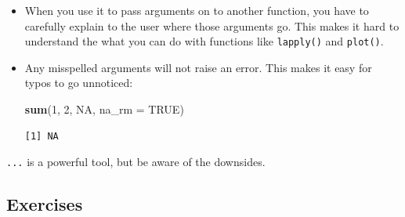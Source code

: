 \documentclass[]{book}
\newenvironment{Shaded}{\begin{snugshade}}{\end{snugshade}}
\newcommand{\DataTypeTok}[1]{\textcolor[rgb]{0.13,0.29,0.53}{#1}}
\newcommand{\DecValTok}[1]{\textcolor[rgb]{0.00,0.00,0.81}{#1}}
\newcommand{\KeywordTok}[1]{\textcolor[rgb]{0.13,0.29,0.53}{\textbf{#1}}}
\newcommand{\NormalTok}[1]{#1}
\newcommand{\OtherTok}[1]{\textcolor[rgb]{0.56,0.35,0.01}{#1}}
\theoremstyle{definition}
\theoremstyle{definition}
\theoremstyle{definition}
\theoremstyle{remark}
\begin{document}
\begin{itemize}
\item
  When you use it to pass arguments on to another function, you have to
  carefully explain to the user where those arguments go. This makes it
  hard to understand the what you can do with functions like
  \texttt{lapply()} and \texttt{plot()}.
\item
  Any misspelled arguments will not raise an error. This makes it easy
  for typos to go unnoticed:

\begin{Shaded}
\begin{Highlighting}[]
\KeywordTok{sum}\NormalTok{(}\DecValTok{1}\NormalTok{, }\DecValTok{2}\NormalTok{, }\OtherTok{NA}\NormalTok{, }\DataTypeTok{na_rm =} \OtherTok{TRUE}\NormalTok{)}
\end{Highlighting}
\end{Shaded}

\begin{verbatim}
[1] NA
\end{verbatim}
\end{itemize}

\texttt{...} is a powerful tool, but be aware of the downsides.

\hypertarget{exercises-3}{%
\subsection{Exercises}\label{exercises-3}}
\end{document}
